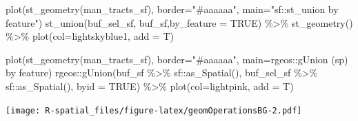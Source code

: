 \documentclass[
  11pt,
]{book}
\newenvironment{Shaded}{\begin{snugshade}}{\end{snugshade}}
\newcommand{\AttributeTok}[1]{\textcolor[rgb]{0.77,0.63,0.00}{#1}}
\newcommand{\ConstantTok}[1]{\textcolor[rgb]{0.00,0.00,0.00}{#1}}
\newcommand{\FunctionTok}[1]{\textcolor[rgb]{0.00,0.00,0.00}{#1}}
\newcommand{\NormalTok}[1]{#1}
\newcommand{\SpecialCharTok}[1]{\textcolor[rgb]{0.00,0.00,0.00}{#1}}
\newcommand{\StringTok}[1]{\textcolor[rgb]{0.31,0.60,0.02}{#1}}
\begin{document}
\begin{Shaded}
\begin{Highlighting}[]
\FunctionTok{plot}\NormalTok{(}\FunctionTok{st\_geometry}\NormalTok{(man\_tracts\_sf), }\AttributeTok{border=}\StringTok{"\#aaaaaa"}\NormalTok{, }\AttributeTok{main=}\StringTok{"sf::st\_union by feature"}\NormalTok{)}
\FunctionTok{st\_union}\NormalTok{(buf\_sel\_sf, buf\_sf,}\AttributeTok{by\_feature =} \ConstantTok{TRUE}\NormalTok{) }\SpecialCharTok{\%\textgreater{}\%} 
  \FunctionTok{st\_geometry}\NormalTok{() }\SpecialCharTok{\%\textgreater{}\%} 
  \FunctionTok{plot}\NormalTok{(}\AttributeTok{col=}\StringTok{\textquotesingle{}lightskyblue1\textquotesingle{}}\NormalTok{, }\AttributeTok{add =}\NormalTok{ T)}

\FunctionTok{plot}\NormalTok{(}\FunctionTok{st\_geometry}\NormalTok{(man\_tracts\_sf), }\AttributeTok{border=}\StringTok{"\#aaaaaa"}\NormalTok{, }\AttributeTok{main=}\StringTok{\textquotesingle{}rgeos::gUnion (sp) by feature\textquotesingle{}}\NormalTok{)}
\NormalTok{rgeos}\SpecialCharTok{::}\FunctionTok{gUnion}\NormalTok{(buf\_sf }\SpecialCharTok{\%\textgreater{}\%}\NormalTok{ sf}\SpecialCharTok{::}\FunctionTok{as\_Spatial}\NormalTok{(), }
\NormalTok{              buf\_sel\_sf }\SpecialCharTok{\%\textgreater{}\%}\NormalTok{ sf}\SpecialCharTok{::}\FunctionTok{as\_Spatial}\NormalTok{(), }
              \AttributeTok{byid =} \ConstantTok{TRUE}\NormalTok{) }\SpecialCharTok{\%\textgreater{}\%} 
  \FunctionTok{plot}\NormalTok{(}\AttributeTok{col=}\StringTok{\textquotesingle{}lightpink\textquotesingle{}}\NormalTok{, }\AttributeTok{add =}\NormalTok{ T)}
\end{Highlighting}
\end{Shaded}

\texttt{[image: R-spatial\_files/figure-latex/geomOperationsBG-2.pdf]}
\end{document}
